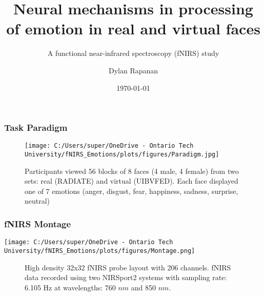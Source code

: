 \documentclass{beamer}
\title{Neural mechanisms in processing of emotion in real and virtual faces}
\subtitle{A functional near-infrared spectroscopy (fNIRS) study}
\author{Dylan Rapanan}
\date{\today}
\begin{document}
\begin{frame}
    \titlepage
\end{frame}

\begin{frame}
    \frametitle{Task Paradigm}
    \begin{figure}
        \centering
        \texttt{[image: C:/Users/super/OneDrive - Ontario Tech University/fNIRS\_Emotions/plots/figures/Paradigm.jpg]}
        \caption{Participants viewed 56 blocks of 8 faces (4 male, 4 female) from two sets:
        real (RADIATE) and virtual (UIBVFED). Each face displayed one of 7
        emotions (anger, disgust, fear, happiness, sadness, surprise, neutral)}
    \end{figure}
\end{frame}

\begin{frame}
    \frametitle{fNIRS Montage}
    \begin{minipage}[t]{0.55\textwidth}
        \vspace{-\baselineskip}
        \texttt{[image: C:/Users/super/OneDrive - Ontario Tech University/fNIRS\_Emotions/plots/figures/Montage.png]}
    \end{minipage}
    \begin{figure}
        \caption{High density 32x32 fNIRS probe layout with 206 channels. \newline
        fNIRS data recorded using two NIRSport2 systems with sampling rate: 6.105 Hz at wavelengths: 760 $nm$ and 850 $nm$.}
    \end{figure}
\end{frame}
\end{document}

